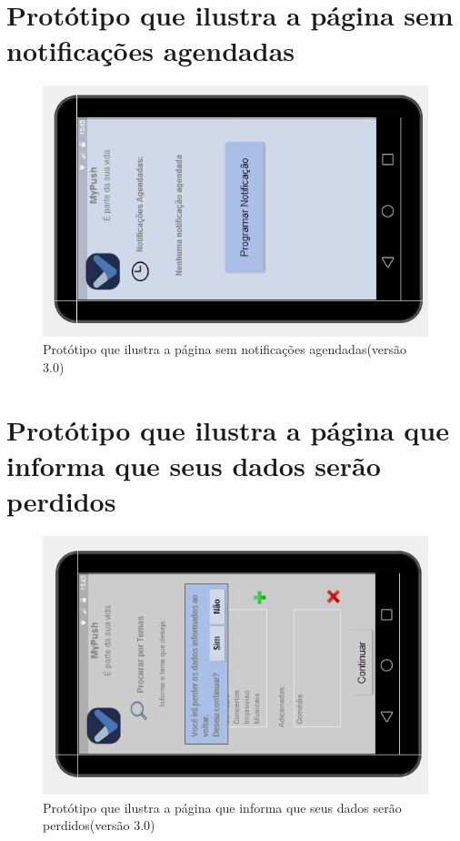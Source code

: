 \begin{apendicesenv}
    \pagebreak
      \section*{Protótipo que ilustra a página sem notificações agendadas}

    \begin{figure}[!htbp]
      \centering
      \includegraphics[scale=0.9, angle=-90]{editaveis/figuras/prototipo_alta_fidelidade_v3/3_9}
      \caption{Protótipo que ilustra a página sem notificações agendadas(versão 3.0)}
      \label{v3}
    \end{figure}
    
    \pagebreak
      \section*{Protótipo que ilustra a página que informa que seus dados serão perdidos}

    \begin{figure}[!htbp]
      \centering
      \includegraphics[scale=0.9, angle=-90]{editaveis/figuras/prototipo_alta_fidelidade_v3/3_10}
      \caption{Protótipo que ilustra a página que informa que seus dados serão perdidos(versão 3.0)}
      \label{v3}
    \end{figure}
    

\end{apendicesenv}

